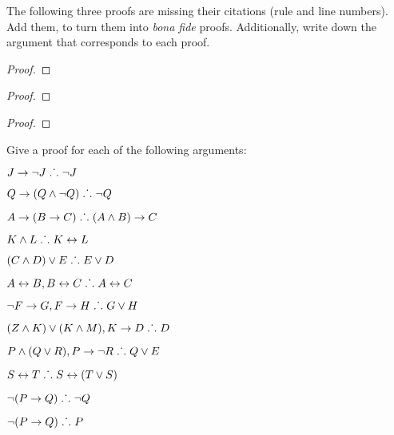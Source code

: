 \problempart
The following three proofs are missing their citations (rule and line numbers). Add them, to turn them into \emph{bona fide} proofs. Additionally, write down the argument that corresponds to each proof.
\begin{multicols}{2}
\begin{proof}
\end{proof}

\begin{proof}
\open
\close
{}%
\end{proof}

\begin{proof}
\open
\close
\open
\close
{}%
\end{proof}
\end{multicols}

\solutions
\problempart
\label{pr.solvedTFLproofs}
Give a proof for each of the following arguments:
\begin{earg}
\item $J\rightarrow\neg J \mathrel{\ldotp\dot{}\,\ldotp} \neg J$
\item $Q\rightarrow(Q\wedge\neg Q) \mathrel{\ldotp\dot{}\,\ldotp} \neg Q$
\item $A\rightarrow (B\rightarrow C) \mathrel{\ldotp\dot{}\,\ldotp} (A\wedge B)\rightarrow C$
\item $K\wedge L \mathrel{\ldotp\dot{}\,\ldotp} K\leftrightarrow L$
\item $(C\wedge D)\vee E \mathrel{\ldotp\dot{}\,\ldotp} E\vee D$
\item $A\leftrightarrow B, B\leftrightarrow C \mathrel{\ldotp\dot{}\,\ldotp} A\leftrightarrow C$
\item $\neg F\rightarrow G, F\rightarrow H \mathrel{\ldotp\dot{}\,\ldotp} G\vee H$
\item $(Z\wedge K) \vee (K\wedge M), K \rightarrow D \mathrel{\ldotp\dot{}\,\ldotp} D$
\item $P \wedge (Q\vee R), P\rightarrow \neg R \mathrel{\ldotp\dot{}\,\ldotp} Q\vee E$
\item $S\leftrightarrow T \mathrel{\ldotp\dot{}\,\ldotp} S\leftrightarrow (T\vee S)$
\item $\neg (P \rightarrow Q) \mathrel{\ldotp\dot{}\,\ldotp} \neg Q$
\item $\neg (P \rightarrow Q) \mathrel{\ldotp\dot{}\,\ldotp} P$
\end{earg}


